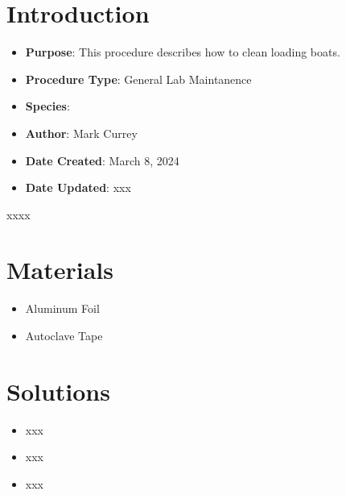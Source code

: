 \documentclass[
  letterpaper,
  DIV=11,
  numbers=noendperiod]{scrreprt}
\providecommand{\tightlist}{%
  \setlength{\itemsep}{0pt}\setlength{\parskip}{0pt}}\usepackage{longtable,booktabs,array}
\begin{document}
\hypertarget{introduction-5}{%
\section{Introduction}\label{introduction-5}}

\begin{itemize}
\item
  \textbf{Purpose}: This procedure describes how to clean loading boats.
\item
  \textbf{Procedure Type}: General Lab Maintanence
\item
  \textbf{Species}:
\item
  \textbf{Author}: Mark Currey
\item
  \textbf{Date Created}: March 8, 2024
\item
  \textbf{Date Updated}: xxx
\end{itemize}

\begin{tcolorbox}[enhanced jigsaw, rightrule=.15mm, title=\textcolor{quarto-callout-warning-color}{\faExclamationTriangle}\hspace{0.5em}{NOTES}, titlerule=0mm, opacitybacktitle=0.6, toprule=.15mm, bottomrule=.15mm, opacityback=0, left=2mm, colframe=quarto-callout-warning-color-frame, breakable, coltitle=black, colback=white, colbacktitle=quarto-callout-warning-color!10!white, bottomtitle=1mm, leftrule=.75mm, toptitle=1mm, arc=.35mm]

xxxx

\end{tcolorbox}

\hypertarget{materials-5}{%
\section{Materials}\label{materials-5}}

\begin{itemize}
\tightlist
\item
  Aluminum Foil
\item
  Autoclave Tape
\end{itemize}

\hypertarget{solutions-5}{%
\section{Solutions}\label{solutions-5}}

\begin{itemize}
\tightlist
\item
  xxx
\item
  xxx
\item
  xxx
\end{itemize}
\end{document}
